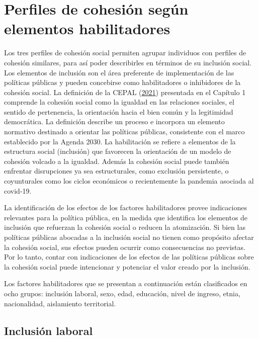 \documentclass[
  12pt,
]{book}
\begin{document}
\hypertarget{perfiles-de-cohesiuxf3n-seguxfan-elementos-habilitadores}{%
\section{Perfiles de cohesión según elementos habilitadores}\label{perfiles-de-cohesiuxf3n-seguxfan-elementos-habilitadores}}

Los tres perfiles de cohesión social permiten agrupar individuos con perfiles de cohesión similares, para así poder describirles en términos de su inclusión social. Los elementos de inclusión son el área preferente de implementación de las políticas públicas y pueden concebirse como habilitadores o inhibidores de la cohesión social. La definición de la CEPAL (\protect\hyperlink{ref-cepal_cohesion_2021}{2021}) presentada en el Capítulo 1 comprende la cohesión social como la igualdad en las relaciones sociales, el sentido de pertenencia, la orientación hacia el bien común y la legitimidad democrática. La definición describe un proceso e incorpora un elemento normativo destinado a orientar las políticas públicas, consistente con el marco establecido por la Agenda 2030. La habilitación se refiere a elementos de la estructura social (inclusión) que favorecen la orientación de un modelo de cohesión volcado a la igualdad. Además la cohesión social puede también enfrentar disrupciones ya sea estructurales, como exclusión persistente, o coyunturales como los ciclos económicos o recientemente la pandemia asociada al covid-19.

La identificación de los efectos de los factores habilitadores provee indicaciones relevantes para la política pública, en la medida que identifica los elementos de inclusión que refuerzan la cohesión social o reducen la atomización. Si bien las políticas públicas abocadas a la inclusión social no tienen como propósito afectar la cohesión social, sus efectos pueden ocurrir como consecuencias no previstas. Por lo tanto, contar con indicaciones de los efectos de las políticas públicas sobre la cohesión social puede intencionar y potenciar el valor creado por la inclusión.

Los factores habilitadores que se presentan a continuación están clasificados en ocho grupos: inclusión laboral, sexo, edad, educación, nivel de ingreso, etnia, nacionalidad, aislamiento territorial.

\hypertarget{inclusiuxf3n-laboral}{%
\subsection{Inclusión laboral}\label{inclusiuxf3n-laboral}}
\end{document}

